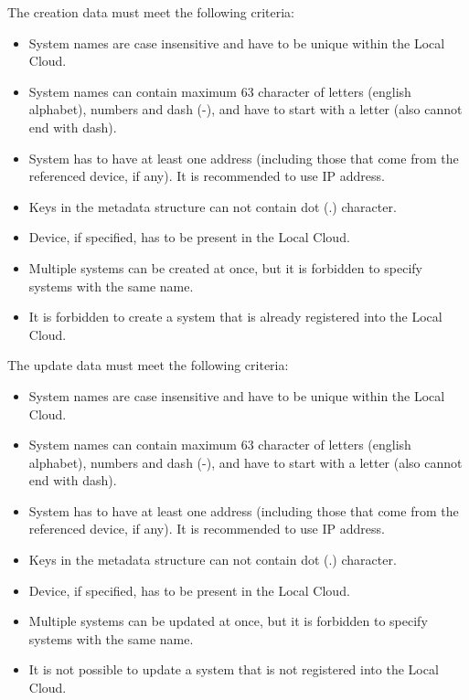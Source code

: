 \documentclass[a4paper]{arrowhead}
\begin{document}
The creation data must meet the following criteria:

\begin{itemize}
    \item System names are case insensitive and have to be unique within the Local Cloud.
    \item System names can contain maximum 63 character of letters (english alphabet), numbers and dash (-), and have to start with a letter (also cannot end with dash).
    \item System has to have at least one address (including those that come from the referenced device, if any). It is recommended to use IP address. 
    \item Keys in the metadata structure can not contain dot (.) character.
    \item Device, if specified, has to be present in the Local Cloud.
    \item Multiple systems can be created at once, but it is forbidden to specify systems with the same name.
    \item It is forbidden to create a system that is already registered into the Local Cloud.
\end{itemize}


The update data must meet the following criteria:

\begin{itemize}
    \item System names are case insensitive and have to be unique within the Local Cloud.
    \item System names can contain maximum 63 character of letters (english alphabet), numbers and dash (-), and have to start with a letter (also cannot end with dash).
    \item System has to have at least one address (including those that come from the referenced device, if any). It is recommended to use IP address. 
    \item Keys in the metadata structure can not contain dot (.) character.
    \item Device, if specified, has to be present in the Local Cloud.
    \item Multiple systems can be updated at once, but it is forbidden to specify systems with the same name.
    \item It is not possible to update a system that is not registered into the Local Cloud.
\end{itemize}
\end{document}
